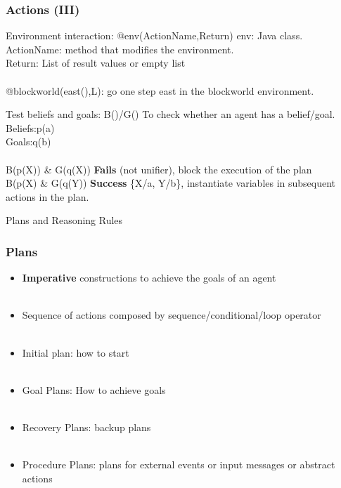 \documentclass{beamer}
\newcommand\tab[1][1cm]{\hspace*{#1}}
\begin{document}
\begin{frame}
\frametitle{Actions (III)}
   \begin{block}{Environment interaction: @env(ActionName,Return)}
    	env: Java class.\\
        ActionName: method that modifies the environment.\\
        Return: List of result values or empty list\\~\\
    	
        @blockworld(east(),L): go one step east in the blockworld environment.
	\end{block}
    
	\begin{block}{Test beliefs and goals: B()/G()}
      To check whether an agent has a belief/goal. \\	
      Beliefs:\tab p(a)\\
      Goals:\tab q(b)\\~\\
      B(p(X)) \& G(q(X)) \textbf{Fails} (not unifier), block the execution of the plan\\
      B(p(X) \& G(q(Y)) \textbf{Success} \{X/a, Y/b\}, instantiate variables in subsequent actions in the plan. 
	\end{block}
\end{frame}

\begin{frame}
\Huge{\centerline{Plans and Reasoning Rules}}
\end{frame}

\begin{frame}
\frametitle{Plans}
	\begin{itemize}
    	\item \textbf{Imperative} constructions to achieve the goals of an agent \\~\\
    	\item Sequence of actions composed by sequence/conditional/loop operator \\~\\
        \item Initial plan: how to start\\~\\
        \item Goal Plans: How to achieve goals\\~\\
        \item Recovery Plans: backup plans\\~\\
        \item Procedure Plans: plans for external events or input messages or abstract actions\\~\\
	\end{itemize}
\end{frame}
\end{document}
